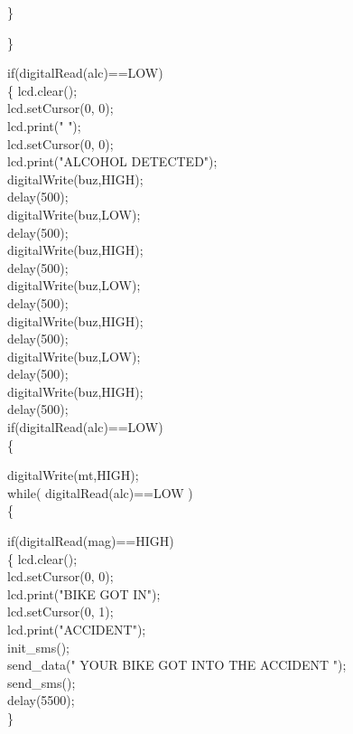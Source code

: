 \}\vspace{.3cm}

\}\vspace{.3cm}

if(digitalRead(alc)==LOW)\\
\{  lcd.clear();\\
lcd.setCursor(0, 0);\\
lcd.print("               ");\\
lcd.setCursor(0, 0);\\
lcd.print("ALCOHOL DETECTED");\\

digitalWrite(buz,HIGH);\\
delay(500);\\
digitalWrite(buz,LOW);\\
delay(500);\\
digitalWrite(buz,HIGH);\\
delay(500);\\
digitalWrite(buz,LOW);\\
delay(500);\\
digitalWrite(buz,HIGH);\\
delay(500);\\
digitalWrite(buz,LOW);\\
delay(500);\\
digitalWrite(buz,HIGH);\\
delay(500);\\

if(digitalRead(alc)==LOW)\\
\{  \vspace{.3cm}

digitalWrite(mt,HIGH);\\
while( digitalRead(alc)==LOW )\\
\{\vspace{.3cm}

if(digitalRead(mag)==HIGH)\\
\{
lcd.clear();\\
lcd.setCursor(0, 0);\\
lcd.print("BIKE GOT IN");\\
lcd.setCursor(0, 1);\\
lcd.print("ACCIDENT");\\
init\_sms();\\
send\_data(" YOUR BIKE GOT INTO THE ACCIDENT ");\\
send\_sms();\\

delay(5500);\\
\} \vspace{.3cm}

